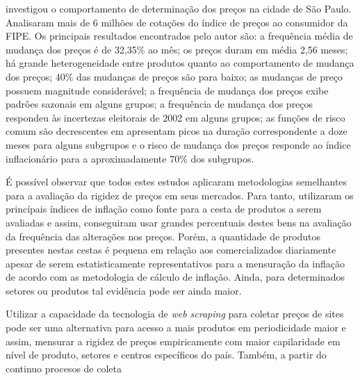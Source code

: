 \documentclass[twoside,a4paper,11pt]{report}
\begin{document}
\citet{lopes2008rigidez} investigou o comportamento de determinação dos preços na cidade de São Paulo. Analisaram mais de 6 milhões de cotações do índice de preços ao consumidor da FIPE. Os principais resultados encontrados pelo autor são: a frequência média de mudança dos preços é de 32,35\% ao mês; os preços duram em média 2,56 meses; há grande heterogeneidade entre produtos quanto ao comportamento de mudança dos preços; 40\% das mudanças de preços são para baixo; as mudanças de preço possuem magnitude considerável; a frequência de mudança dos preços exibe padrôes sazonais em alguns grupos; a frequência de mudança dos preços respondeu às incertezas eleitorais de 2002 em alguns grupos; as funções de risco comum são decrescentes em apresentam picos na duração correspondente a doze meses para alguns subgrupos e o risco de mudança dos preços responde ao índice inflacionário para a aproximadamente 70\% dos subgrupos.
 
É possível observar que todos estes estudos aplicaram metodologias semelhantes para a avaliação da rigidez de preços em seus mercados. Para tanto, utilizaram os princípais índices de inflação como fonte para a cesta de produtos a serem avaliadas e assim, conseguiram usar grandes percentuais destes bens na avaliação da frequência das alterações nos preços. Porém, a quantidade de produtos presentes nestas cestas é pequena em relação aos comercializados diariamente apesar de serem estatisticamente representativos para a mensuração da inflação de acordo com as metodologia de cálculo de inflação. Ainda, para determinados setores ou produtos tal evidência pode ser ainda maior. 

Utilizar a capacidade da tecnologia de \emph{web scraping} para coletar preços de sites pode ser uma alternativa para acesso a mais produtos em periodicidade maior e assim, mensurar a rigidez de preços empiricamente com maior capilaridade em nível de produto, setores e centros específicos do país. Também, a partir do continuo procesos de coleta
\end{document}
